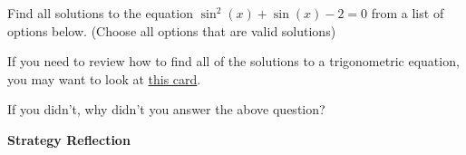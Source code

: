 \documentclass{ximera}
\begin{document}
\begin{problem} 

\begin{problem}
    Find all solutions to the equation $\sin^2(x) + \sin(x) -2 = 0$ from a list of options below.  (Choose all options that are valid solutions)
    
    \begin{hint}
    If you need to review how to find all of the solutions to a trigonometric equation, you may want to look at \href{https://ximera.osu.edu/math160fa17/m160prerequisites/prerequisiteVideos/trigSolvingEquations}{this card}.
    \end{hint}

  \begin{selectAll}
      
      
  \end{selectAll}
  
\end{problem}

\begin{question}
  
  If you didn't, why didn't you answer the above question?
  
  \begin{multipleChoice}
      

  \end{multipleChoice}
  
\end{question}
  
\end{problem}


\begin{center} \textbf{Strategy Reflection}\end{center}
\end{document}

